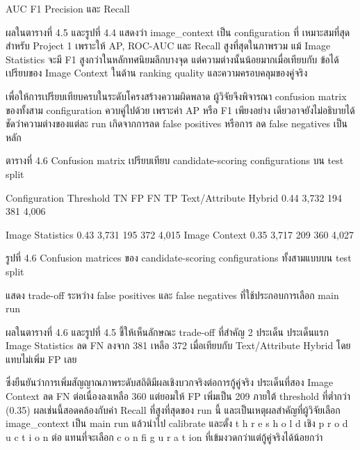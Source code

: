 \documentclass[12pt,a4paper]{report}
\begin{document}
AUC F1 Precision และ Recall\par
ผลในตารางที่ 4.5 และรูปที่ 4.4 แสดงว่า image\_context เป็น configuration ที่ เหมาะสมที่สุดสำหรับ Project 1 เพราะให้ AP, ROC-AUC และ Recall สูงที่สุดในภาพรวม แม้ Image Statistics จะมี F1 สูงกว่าในหลักทศนิยมลึกบางจุด แต่ความต่างนั้นน้อยมากเมื่อเทียบกับ ข้อได้เปรียบของ Image Context ในด้าน ranking quality และความครอบคลุมของคู่จริง\par
เพื่อให้การเปรียบเทียบครบในระดับโครงสร้างความผิดพลาด ผู้วิจัยจึงพิจารณา confusion matrix ของทั้งสาม configuration ควบคู่ไปด้วย เพราะค่า AP หรือ F1 เพียงอย่าง เดียวอาจยังไม่อธิบายได้ชัดว่าความต่างของแต่ละ run เกิดจากการลด false positives หรือการ ลด false negatives เป็นหลัก\par
\begin{center}\small ตารางที่ 4.6 Confusion matrix เปรียบเทียบ candidate-scoring configurations บน test split\end{center}
Configuration Threshold TN FP FN TP Text/Attribute Hybrid 0.44 3,732 194 381 4,006\par
Image Statistics 0.43 3,731 195 372 4,015 Image Context 0.35 3,717 209 360 4,027\par
\clearpage
\begin{center}\small รูปที่ 4.6 Confusion matrices ของ candidate-scoring configurations ทั้งสามแบบบน test split\end{center}
แสดง trade-off ระหว่าง false positives และ false negatives ที่ใช้ประกอบการเลือก main run\par
ผลในตารางที่ 4.6 และรูปที่ 4.5 ชี้ให้เห็นลักษณะ trade-off ที่สำคัญ 2 ประเด็น ประเด็นแรก Image Statistics ลด FN ลงจาก 381 เหลือ 372 เมื่อเทียบกับ Text/Attribute Hybrid โดยแทบไม่เพิ่ม FP เลย\par
ซึ่งยืนยันว่าการเพิ่มสัญญาณภาพระดับสถิติมีผลเชิงบวกจริงต่อการกู้คู่จริง ประเด็นที่สอง Image Context ลด FN ต่อเนื่องลงเหลือ 360 แต่ยอมให้ FP เพิ่มเป็น 209 ภายใต้ threshold ที่ต่ำกว่า (0.35) ผลเช่นนี้สอดคล้องกับค่า Recall ที่สูงที่สุดของ run นี้ และเป็นเหตุผลสำคัญที่ผู้วิจัยเลือก image\_context เป็น main run แล้วนำไป calibrate และตั้ง t h r e s h o l d เชิง p r o d u c t i o n ต่อ แทนที่จะเลือก c o n fi g u r a t ion ที่เข้มงวดกว่าแต่กู้คู่จริงได้น้อยกว่า\par
\end{document}
